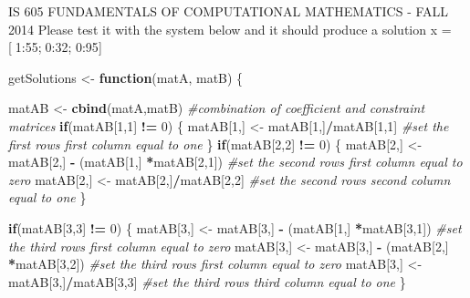 \documentclass[
]{article}
\newenvironment{Shaded}{\begin{snugshade}}{\end{snugshade}}
\newcommand{\CommentTok}[1]{\textcolor[rgb]{0.56,0.35,0.01}{\textit{#1}}}
\newcommand{\ControlFlowTok}[1]{\textcolor[rgb]{0.13,0.29,0.53}{\textbf{#1}}}
\newcommand{\DecValTok}[1]{\textcolor[rgb]{0.00,0.00,0.81}{#1}}
\newcommand{\KeywordTok}[1]{\textcolor[rgb]{0.13,0.29,0.53}{\textbf{#1}}}
\newcommand{\NormalTok}[1]{#1}
\newcommand{\OperatorTok}[1]{\textcolor[rgb]{0.81,0.36,0.00}{\textbf{#1}}}
\newcommand{\StringTok}[1]{\textcolor[rgb]{0.31,0.60,0.02}{#1}}
\begin{document}
IS 605 FUNDAMENTALS OF COMPUTATIONAL MATHEMATICS - FALL 2014 Please test
it with the system below and it should produce a solution x =
{[}􀀀1:55;􀀀0:32; 0:95{]}

\begin{Shaded}
\begin{Highlighting}[]
\NormalTok{getSolutions \textless{}{-}}\StringTok{ }\ControlFlowTok{function}\NormalTok{(matA, matB) \{}

\NormalTok{  matAB \textless{}{-}}\StringTok{ }\KeywordTok{cbind}\NormalTok{(matA,matB) }\CommentTok{\#combination of coefficient and constraint matrices}
  \ControlFlowTok{if}\NormalTok{(matAB[}\DecValTok{1}\NormalTok{,}\DecValTok{1}\NormalTok{] }\OperatorTok{!=}\StringTok{ }\DecValTok{0}\NormalTok{) \{ }
\NormalTok{    matAB[}\DecValTok{1}\NormalTok{,] \textless{}{-}}\StringTok{ }\NormalTok{matAB[}\DecValTok{1}\NormalTok{,]}\OperatorTok{/}\NormalTok{matAB[}\DecValTok{1}\NormalTok{,}\DecValTok{1}\NormalTok{] }\CommentTok{\#set the first row\textquotesingle{}s first column equal to one}
\NormalTok{  \}}
  \ControlFlowTok{if}\NormalTok{(matAB[}\DecValTok{2}\NormalTok{,}\DecValTok{2}\NormalTok{] }\OperatorTok{!=}\StringTok{ }\DecValTok{0}\NormalTok{) \{}
\NormalTok{    matAB[}\DecValTok{2}\NormalTok{,] \textless{}{-}}\StringTok{ }\NormalTok{matAB[}\DecValTok{2}\NormalTok{,] }\OperatorTok{{-}}\StringTok{ }\NormalTok{(matAB[}\DecValTok{1}\NormalTok{,] }\OperatorTok{*}\NormalTok{matAB[}\DecValTok{2}\NormalTok{,}\DecValTok{1}\NormalTok{]) }\CommentTok{\#set the second row\textquotesingle{}s first column equal to zero}
\NormalTok{    matAB[}\DecValTok{2}\NormalTok{,] \textless{}{-}}\StringTok{ }\NormalTok{matAB[}\DecValTok{2}\NormalTok{,]}\OperatorTok{/}\NormalTok{matAB[}\DecValTok{2}\NormalTok{,}\DecValTok{2}\NormalTok{] }\CommentTok{\#set the second row\textquotesingle{}s second column equal to one}
\NormalTok{  \}}
  
  \ControlFlowTok{if}\NormalTok{(matAB[}\DecValTok{3}\NormalTok{,}\DecValTok{3}\NormalTok{] }\OperatorTok{!=}\StringTok{ }\DecValTok{0}\NormalTok{) \{}
\NormalTok{    matAB[}\DecValTok{3}\NormalTok{,] \textless{}{-}}\StringTok{ }\NormalTok{matAB[}\DecValTok{3}\NormalTok{,] }\OperatorTok{{-}}\StringTok{ }\NormalTok{(matAB[}\DecValTok{1}\NormalTok{,] }\OperatorTok{*}\NormalTok{matAB[}\DecValTok{3}\NormalTok{,}\DecValTok{1}\NormalTok{]) }\CommentTok{\#set the third row\textquotesingle{}s first column equal to zero}
\NormalTok{    matAB[}\DecValTok{3}\NormalTok{,] \textless{}{-}}\StringTok{ }\NormalTok{matAB[}\DecValTok{3}\NormalTok{,] }\OperatorTok{{-}}\StringTok{ }\NormalTok{(matAB[}\DecValTok{2}\NormalTok{,] }\OperatorTok{*}\NormalTok{matAB[}\DecValTok{3}\NormalTok{,}\DecValTok{2}\NormalTok{]) }\CommentTok{\#set the third row\textquotesingle{}s first column equal to zero}
\NormalTok{    matAB[}\DecValTok{3}\NormalTok{,] \textless{}{-}}\StringTok{ }\NormalTok{matAB[}\DecValTok{3}\NormalTok{,]}\OperatorTok{/}\NormalTok{matAB[}\DecValTok{3}\NormalTok{,}\DecValTok{3}\NormalTok{] }\CommentTok{\#set the third row\textquotesingle{}s third column equal to one}
\NormalTok{  \}}
  

\end{Highlighting}
\end{Shaded}
\end{document}
